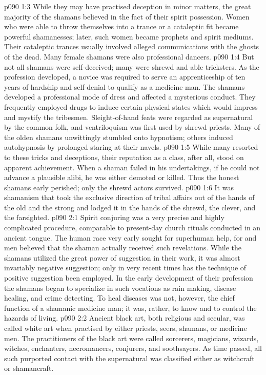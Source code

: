 \vs p090 1:3 While they may have practised deception in minor matters, the great majority of the shamans believed in the fact of their spirit possession. Women who were able to throw themselves into a trance or a cataleptic fit became powerful shamanesses; later, such women became prophets and spirit mediums. Their cataleptic trances usually involved alleged communications with the ghosts of the dead. Many female shamans were also professional dancers.
\vs p090 1:4 But not all shamans were self\hyp{}deceived; many were shrewd and able tricksters. As the profession developed, a novice was required to serve an apprenticeship of ten years of hardship and self\hyp{}denial to qualify as a medicine man. The shamans developed a professional mode of dress and affected a mysterious conduct. They frequently employed drugs to induce certain physical states which would impress and mystify the tribesmen. Sleight\hyp{}of\hyp{}hand feats were regarded as supernatural by the common folk, and ventriloquism was first used by shrewd priests. Many of the olden shamans unwittingly stumbled onto hypnotism; others induced autohypnosis by prolonged staring at their navels.
\vs p090 1:5 While many resorted to these tricks and deceptions, their reputation as a class, after all, stood on apparent achievement. When a shaman failed in his undertakings, if he could not advance a plausible alibi, he was either demoted or killed. Thus the honest shamans early perished; only the shrewd actors survived.
\vs p090 1:6 It was shamanism that took the exclusive direction of tribal affairs out of the hands of the old and the strong and lodged it in the hands of the shrewd, the clever, and the farsighted.
\vs p090 2:1 Spirit conjuring was a very precise and highly complicated procedure, comparable to present\hyp{}day church rituals conducted in an ancient tongue. The human race very early sought for superhuman help, for  and men believed that the shaman actually received such revelations. While the shamans utilized the great power of suggestion in their work, it was almost invariably negative suggestion; only in very recent times has the technique of positive suggestion been employed. In the early development of their profession the shamans began to specialize in such vocations as rain making, disease healing, and crime detecting. To heal diseases was not, however, the chief function of a shamanic medicine man; it was, rather, to know and to control the hazards of living.
\vs p090 2:2 Ancient black art, both religious and secular, was called white art when practised by either priests, seers, shamans, or medicine men. The practitioners of the black art were called sorcerers, magicians, wizards, witches, enchanters, necromancers, conjurers, and soothsayers. As time passed, all such purported contact with the supernatural was classified either as witchcraft or shamancraft.
